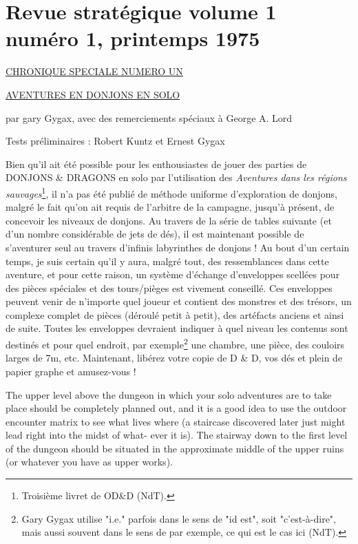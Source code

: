 \newpage
{}\section*{Revue stratégique volume 1 numéro 1, printemps 1975}
\label{sr11}

\bigskip\bigskip

\begin{center}
\underline{\underline{CHRONIQUE SPECIALE NUMERO UN}}
\end{center}

\bigskip

\begin{center}
\underline{AVENTURES EN DONJONS EN SOLO}
\end{center}

\bigskip

par gary Gygax, avec des remerciements spéciaux à George A. Lord

Tests préliminaires : Robert Kuntz et Ernest Gygax

\medskip

Bien qu'il ait été possible pour les enthousiastes de jouer des parties de DONJONS \& DRAGONS en solo par l'utilisation des \textit{Aventures dans les régions sauvages}\footnote{Troisième livret de OD\&D (NdT).}, il n'a pas été publié de méthode uniforme d'exploration de donjons, malgré le fait qu'on ait requis de l'arbitre de la campagne, jusqu'à présent, de concevoir les niveaux de donjons. Au travers de la série de tables suivante (et d'un nombre considérable de jets de dés), il est maintenant possible de s'aventurer seul au travers d'infinis labyrinthes de donjons ! Au bout d'un certain temps, je suis certain qu'il y aura, malgré tout, des ressemblances dans cette aventure, et pour cette raison, un système d'échange d'enveloppes scellées pour des pièces spéciales et des tours/pièges est vivement conseillé. Ces enveloppes peuvent venir de n'importe quel joueur et contient des monstres et des trésors, un complexe complet de pièces (déroulé petit à petit), des artéfacts anciens et ainsi de suite. Toutes les enveloppes devraient indiquer à quel niveau les contenus sont destinés et pour quel endroit, par exemple\footnote{Gary Gygax utilise "i.e." parfois dans le sens de "id est", soit "c'est-à-dire", mais aussi souvent dans le sens de par exemple, ce qui est le cas ici (NdT).} une chambre, une pièce, des couloirs larges de 7m, etc. Maintenant, libérez votre copie de D \& D, vos dés et plein de papier graphe et amusez-vous !



The upper level above the dungeon in which your solo adventures
are to take place should be completely planned out, and it is a good
idea to use the outdoor encounter matrix to see what lives where (a
staircase discovered later just might lead right into the midst of what-
ever it is). The stairway down to the first level of the dungeon should
be situated in the approximate middle of the upper ruins (or whatever
you have as upper works).




